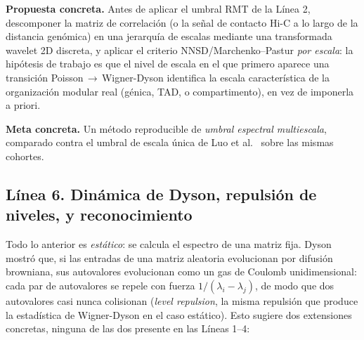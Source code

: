 \documentclass[11pt]{article}
\begin{document}
\textbf{Propuesta concreta.} Antes de aplicar el umbral RMT de la Línea 2, descomponer la matriz de correlación (o la señal de contacto Hi-C a lo largo de la distancia genómica) en una jerarquía de escalas mediante una transformada wavelet 2D discreta, y aplicar el criterio NNSD/Marchenko--Pastur \emph{por escala}: la hipótesis de trabajo es que el nivel de escala en el que primero aparece una transición Poisson\,$\to$\,Wigner-Dyson identifica la escala característica de la organización modular real (génica, TAD, o compartimento), en vez de imponerla a priori.

\textbf{Meta concreta.} Un método reproducible de \emph{umbral espectral multiescala}, comparado contra el umbral de escala única de Luo et al.\ \cite{luo2007} sobre las mismas cohortes.

\subsection{Línea 6. Dinámica de Dyson, repulsión de niveles, y reconocimiento}
Todo lo anterior es \emph{estático}: se calcula el espectro de una matriz fija. Dyson \cite{dyson1962} mostró que, si las entradas de una matriz aleatoria evolucionan por difusión browniana, sus autovalores evolucionan como un gas de Coulomb unidimensional: cada par de autovalores se repele con fuerza $1/(\lambda_i-\lambda_j)$, de modo que dos autovalores casi nunca colisionan (\emph{level repulsion}, la misma repulsión que produce la estadística de Wigner-Dyson en el caso estático). Esto sugiere dos extensiones concretas, ninguna de las dos presente en las Líneas 1--4:
\end{document}
